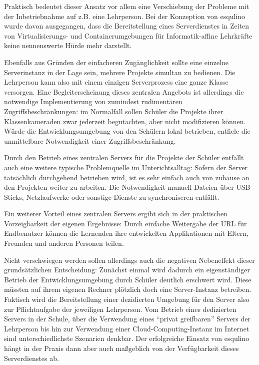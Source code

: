 Praktisch bedeutet dieser Ansatz vor allem eine Verschiebung der Probleme mit der Inbetriebnahme auf z.B. eine Lehrperson. Bei der Konzeption von esqulino wurde davon ausgegangen, dass die Bereitstellung eines Serverdienstes in Zeiten von Virtualisierungs- und Containerumgebungen für Informatik-affine Lehrkräfte keine nennenswerte Hürde mehr darstellt.

Ebenfalls aus Gründen der einfacheren Zugänglichkeit sollte eine einzelne Serverinstanz in der Lage sein, mehrere Projekte simultan zu bedienen. Die Lehrperson kann also mit einem einzigen Serverprozess eine ganze Klasse versorgen. Eine Begleiterscheinung dieses zentralen Angebots ist allerdings die notwendige Implementierung von zumindest rudimentären Zugriffsbeschränkungen: im Normalfall sollen Schüler die Projekte ihrer Klassenkameraden zwar jederzeit begutachten, aber nicht modifizieren können. Würde die Entwicklungsumgebung von den Schülern lokal betrieben, entfiele die unmittelbare Notwendigkeit einer Zugriffsbeschränkung.

Durch den Betrieb eines zentralen Servers für die Projekte der Schüler entfällt auch eine weitere typische Problemquelle im Unterichtsalltag: Sofern der Server tatsächlich durchgehend betrieben wird, ist es sehr einfach auch von zuhause an den Projekten weiter zu arbeiten. Die Notwendigkeit manuell Dateien über USB-Sticks, Netzlaufwerke oder sonstige Dienste zu synchroniseren entfällt.

Ein weiterer Vorteil eines zentralen Servers ergibt sich in der praktischen Vorzeigbarkeit der eigenen Ergebnisse: Durch einfache Weitergabe der URL für Endbenutzer können die Lernenden ihre entwickelten Applikationen mit Eltern, Freunden und anderen Personen teilen. 

Nicht verschwiegen werden sollen allerdings auch die negativen Nebeneffekt dieser grundsätzlichen Entscheidung: Zunächst einmal wird dadurch ein eigenständiger Betrieb der Entwicklungsumgebung durch Schüler deutlich erschwert wird. Diese müssten auf ihrem eigenen Rechner plötzlich doch eine Server-Instanz betreiben. Faktisch wird die Bereitstellung einer dezidierten Umgebung für den Server also zur Pflichtaufgabe der jeweiligen Lehrperson. Vom Betrieb eines dedizierten Servers in der Schule, über die Verwendung eines ``privat greifbaren'' Servers der Lehrperson bis hin zur Verwendung einer Cloud-Computing-Instanz im Internet sind unterschiedlichste Szenarien denkbar. Der erfolgreiche Einsatz von esqulino hängt in der Praxis dann aber auch maßgeblich von der Verfügbarkeit dieses Serverdienstes ab.

